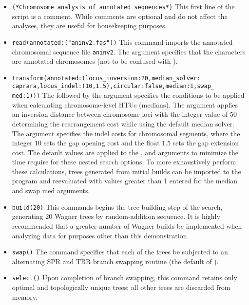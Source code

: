 \begin{itemize}
\item \texttt{(*Chromosome analysis of annotated sequences*)} This first line of the script is a comment. While 
comments are optional and do not affect the analyses, they are useful for housekeeping purposes.
\item \texttt{read(annotated:("aninv2.fas"))} This command imports the annotated chromosomal sequence file 
\texttt{aninv2}. The argument  specifies that the characters are annotated chromosomes
(not to be confused with ). 
\item \texttt{transform(annotated:(locus\_inversion:20,median\_solver:\\caprara,locus\_indel:(10,1.5),circular:false,median:1,swap\_\\
med:1)))} The  followed by the argument  specifies the conditions to be 
applied when calculating chromosome-level HTUs (medians). The argument  applies an 
inversion distance between chromosome loci with the integer value  of $50$ determining the rearrangement cost 
while using the default  median solver. The argument  specifies 
the indel costs for chromosomal segments, where the integer $10$ sets the gap opening cost and the float $1.5$ 
sets the gap extension cost. The default values are applied to the ,  
and  arguments to minimize the time require for these nested search options. To more 
exhaustively perform these calculations, trees generated from initial builds can be imported to the program and reevaluated 
with values greater than 1 entered for the median and swap med arguments.
\item \texttt{build(20)} This commands begins the tree-building step of the search, generating 20 Wagner trees by random-addition 
sequence.  It is highly recommended that a greater number of Wagner builds be implemented when analyzing 
data for purposes other than this demonstration.
\item \texttt{swap()} The  command specifies that each of the trees be subjected to an alternating 
SPR and TBR branch swapping routine (the default of \poy).
\item \texttt{select()} Upon completion of branch swapping, this command retains only optimal and topologically 
unique trees; all other trees are discarded from memory. 

\end{itemize}
